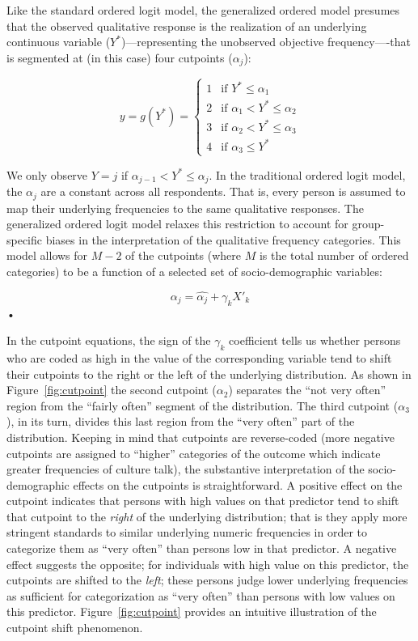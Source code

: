 \documentclass[11pt]{article}
\begin{document}
Like the standard ordered logit model, the generalized ordered model presumes that the observed qualitative response is the realization of an underlying continuous variable ($Y^*$)---representing the unobserved objective frequency----that is segmented at (in this case) four cutpoints ($\alpha_j$):

\begin{equation}
	y=g(Y^{*})=\left\{\begin{array}{rl}
	  1 &\mbox{if $Y^{*} \leq \alpha_{1}$} \\
	  2 &\mbox{if $\alpha_{1} < Y^{*} \leq \alpha_{2}$}\\ 
	  3 &\mbox{if $\alpha_{2} <Y^{*} \leq \alpha_{3}$}\\ 
	  4 &\mbox{if $\alpha_{3} \leq Y^{*}$} 
	 \end{array} \right.
	 \label{eq:equation3}
\end{equation}
 
We only observe $Y=j$ if $\alpha_{j-1} < Y^{*} \leq \alpha_{j}$.  In the traditional ordered logit model, the $\alpha_j$ are a constant across all respondents.  That is, every person is assumed to map their underlying frequencies to the same qualitative responses.  The generalized ordered logit model relaxes this restriction to account for group-specific biases in the interpretation of the qualitative frequency categories. This model allows for $M-2$ of the cutpoints (where $M$ is the total number of ordered categories) to be a function of a selected set of socio-demographic variables:

\begin{equation}
\alpha_j=\hat{\alpha_j}+\gamma_kX'_k
\end{equation}•

In the cutpoint equations,  the sign of the $\gamma_k$ coefficient tells us whether persons who are coded as high in the value of the corresponding variable tend to shift their cutpoints to the right or the left of the underlying distribution.  As shown in Figure~\ref{fig:cutpoint} the second cutpoint ($\alpha_2$) separates the ``not very often'' region from the ``fairly often'' segment of the distribution.  The third cutpoint ($\alpha_3$), in its turn, divides this last region from the ``very often'' part of the distribution.  Keeping in mind that cutpoints are reverse-coded (more negative cutpoints are assigned to ``higher'' categories of the outcome which indicate greater frequencies of culture talk), the substantive interpretation of the socio-demographic effects on the cutpoints is straightforward.  A positive effect on the cutpoint indicates that persons with high values on that predictor tend to shift that cutpoint to the \emph{right} of the underlying distribution; that is they apply more stringent standards to similar underlying numeric frequencies in order to categorize them as ``very often'' than persons low in that predictor.  A negative effect suggests the opposite; for individuals with high value on this predictor, the cutpoints are shifted to the \emph{left}; these persons judge lower underlying frequencies as sufficient for categorization as ``very often'' than persons with low values on this predictor.  Figure~\ref{fig:cutpoint} provides an intuitive illustration of the cutpoint shift phenomenon.
\end{document}
